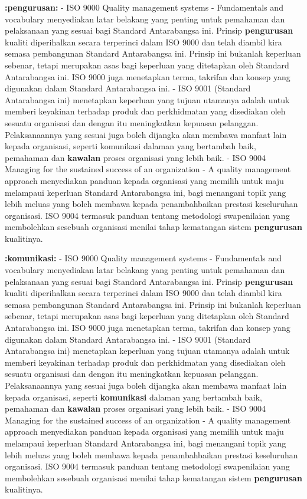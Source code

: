 \documentclass{article}
\begin{document}
\textbf{:pengurusan:} - ISO 9000 Quality management systems - Fundamentals and vocabulary menyediakan
 latar belakang yang penting untuk pemahaman dan pelaksanaan yang sesuai bagi
 Standard Antarabangsa ini. Prinsip \textbf{pengurusan} kualiti diperihalkan secara terperinci
 dalam ISO 9000 dan telah diambil kira semasa pembangunan Standard Antarabangsa
 ini. Prinsip ini bukanlah keperluan sebenar, tetapi merupakan asas bagi keperluan yang
 ditetapkan oleh Standard Antarabangsa ini. ISO 9000 juga menetapkan terma, takrifan
 dan konsep yang digunakan dalam Standard Antarabangsa ini.
- ISO 9001 (Standard Antarabangsa ini) menetapkan keperluan yang tujuan utamanya
 adalah untuk memberi keyakinan terhadap produk dan perkhidmatan yang disediakan
 oleh sesuatu organisasi dan dengan itu meningkatkan kepuasan pelanggan.
 Pelaksanaannya yang sesuai juga boleh dijangka akan membawa manfaat lain kepada
 organisasi, seperti komunikasi dalaman yang bertambah baik, pemahaman dan \textbf{kawalan}
 proses organisasi yang lebih baik.
- ISO 9004 Managing for the sustained success of an organization - A quality
 management approach menyediakan panduan kepada organisasi yang memilih untuk
 maju melampaui keperluan Standard Antarabangsa ini, bagi menangani topik yang lebih
 meluas yang boleh membawa kepada penambahbaikan prestasi keseluruhan organisasi.
 ISO 9004 termasuk panduan tentang metodologi swapenilaian yang membolehkan
 sesebuah organisasi menilai tahap kematangan sistem \textbf{pengurusan} kualitinya.

\textbf{:komunikasi:} - ISO 9000 Quality management systems - Fundamentals and vocabulary menyediakan
 latar belakang yang penting untuk pemahaman dan pelaksanaan yang sesuai bagi
 Standard Antarabangsa ini. Prinsip \textbf{pengurusan} kualiti diperihalkan secara terperinci
 dalam ISO 9000 dan telah diambil kira semasa pembangunan Standard Antarabangsa
 ini. Prinsip ini bukanlah keperluan sebenar, tetapi merupakan asas bagi keperluan yang
 ditetapkan oleh Standard Antarabangsa ini. ISO 9000 juga menetapkan terma, takrifan
 dan konsep yang digunakan dalam Standard Antarabangsa ini.
- ISO 9001 (Standard Antarabangsa ini) menetapkan keperluan yang tujuan utamanya
 adalah untuk memberi keyakinan terhadap produk dan perkhidmatan yang disediakan
 oleh sesuatu organisasi dan dengan itu meningkatkan kepuasan pelanggan.
 Pelaksanaannya yang sesuai juga boleh dijangka akan membawa manfaat lain kepada
 organisasi, seperti \textbf{komunikasi} dalaman yang bertambah baik, pemahaman dan \textbf{kawalan}
 proses organisasi yang lebih baik.
- ISO 9004 Managing for the sustained success of an organization - A quality
 management approach menyediakan panduan kepada organisasi yang memilih untuk
 maju melampaui keperluan Standard Antarabangsa ini, bagi menangani topik yang lebih
 meluas yang boleh membawa kepada penambahbaikan prestasi keseluruhan organisasi.
 ISO 9004 termasuk panduan tentang metodologi swapenilaian yang membolehkan
 sesebuah organisasi menilai tahap kematangan sistem \textbf{pengurusan} kualitinya.
\end{document}
